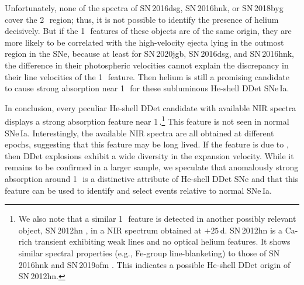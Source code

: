 \documentclass[twocolumn]{aastex631}
\newcommand{\sn}{SN\,2020jgb}
\begin{document}
Unfortunately, none of the spectra of SN\,2016dsg, SN\,2016hnk, or SN\,2018byg cover the 2\,\micron\ region; thus, it is not possible to identify the presence of helium decisively. But if the 1\,\micron\ features of these objects are of the same origin, they are more likely to be correlated with the high-velocity ejecta lying in the outmost region in the SNe, because at least for \sn, SN\,2016dsg, and SN\,2016hnk, the difference in their photospheric velocities cannot explain the discrepancy in their line velocities of the 1\,\micron\ feature. Then helium is still a promising candidate to cause strong absorption near 1\,\micron\ for these subluminous He-shell DDet SNe\,Ia.

In conclusion, every peculiar He-shell DDet candidate with available NIR spectra displays a strong absorption feature near 1\,\micron.\footnote{We also note that a similar 1\,\micron\ feature is detected in another possibly relevant object, SN\,2012hn \citep{Valenti_12hn_2014}, in a NIR spectrum obtained at $+25$\,d. SN\,2012hn is a Ca-rich transient exhibiting weak  lines and no optical helium features. %
It shows similar spectral properties (e.g., Fe-group line-blanketing) to those of SN\,2016hnk and SN\,2019ofm \citep{de_Ca_rich_2020}. This indicates a possible He-shell DDet origin of SN\,2012hn.} This feature is not seen in normal SNe\,Ia. Interestingly, the available NIR spectra are all obtained at different epochs, suggesting that this feature may be long lived. If the feature is due to , then DDet explosions exhibit a wide diversity in the expansion velocity. While it remains to be confirmed in a larger sample, we speculate that anomalously strong absorption around 1\,\micron\ is a distinctive attribute of He-shell DDet SNe and that this feature can be used to identify and select events relative to normal SNe\,Ia.
\end{document}
